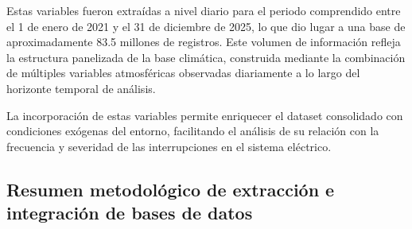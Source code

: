 Estas variables fueron extraídas a nivel diario para el periodo comprendido entre el 1 de enero de 2021 y el 31 de diciembre de 2025, lo que dio lugar a una base de aproximadamente 83.5 millones de registros. Este volumen de información refleja la estructura panelizada de la base climática, construida mediante la combinación de múltiples variables atmosféricas observadas diariamente a lo largo del horizonte temporal de análisis.

La incorporación de estas variables permite enriquecer el dataset consolidado con condiciones exógenas del entorno, facilitando el análisis de su relación con la frecuencia y severidad de las interrupciones en el sistema eléctrico.

\subsection{Resumen metodológico de extracción e integración de bases de datos}

